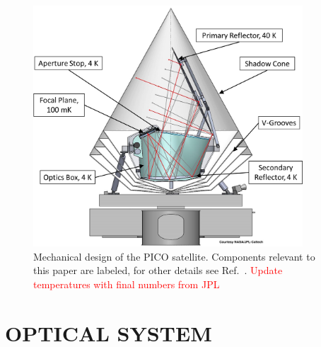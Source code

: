 \documentclass[]{spie}  %
\newcommand{\comr}[1]{\textcolor{red}{#1}}
\begin{document}
\begin{figure} [ht]
\begin{center}
\includegraphics[height=9cm]{PICO_CAD_annotated.png}
\end{center}
\caption { \label{fig:cad} 
Mechanical design of the PICO satellite. Components relevant to this paper are labeled, for other details see Ref.~. 
\comr{Update temperatures with final numbers from JPL}}
\end{figure} 



\section{OPTICAL SYSTEM}
\label{sec:optics}
\end{document}

